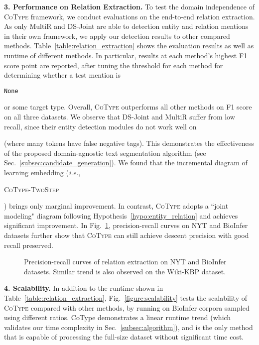 \documentclass[letterpaper]{sig-alternate-2013}
\def\ie{{\sl i.e.}}
\begin{document}
\smallskip\noindent
\textsf{\small\textbf{3. Performance on Relation Extraction.}}
To test the domain independence of \textsc{\small CoType} framework, we conduct evaluations on the end-to-end relation extraction. As only MultiR and DS-Joint are able to detection entity and relation mentions in their own framework, we apply our detection results to other compared methods.
Table~\ref{table:relation_extraction} shows the evaluation results  as well as runtime of different methods. In particular, results at each method's highest F1 score point are reported, after tuning the threshold for each method for determining whether a test mention is \begin{small}\texttt{None}\end{small} or some target type.
Overall, \textsc{\small CoType} outperforms all other methods on F1 score on all three datasets. We observe that DS-Joint and MultiR suffer from low recall, since their entity detection modules do not work well on \begin{small}\end{small} (where many tokens have false negative tags). This demonstrates the effectiveness of the proposed domain-agnostic text segmentation algorithm (see Sec.~\ref{subsec:candidate_generation}).
We found that the incremental diagram of learning embedding (\ie, \begin{small}\textsc{CoType-TwoStep}\end{small}) brings only marginal improvement. In contrast, \textsc{\small CoType} adopts a ``joint modeling" diagram following Hypothesis~\ref{hypo:entity_relation} and achieves significant improvement. In Fig.~\ref{figure:precision_recall_curve}, precision-recall curves on NYT and BioInfer datasets further show that \textsc{\small CoType} can still achieve descent precision with good recall preserved. 

\begin{figure}
\centering
\vspace{-0.4cm}
\vspace{-0.3cm}
\caption{Precision-recall curves of relation extraction on NYT and BioInfer datasets. Similar trend is also observed on the Wiki-KBP dataset.}
\label{figure:precision_recall_curve}
\vspace{-0.1cm}
\end{figure}


\smallskip
\noindent
\textsf{\small\textbf{4. Scalability.}}
In addition to the runtime shown in Table~\ref{table:relation_extraction}, Fig.~\ref{figure:scalability} tests the scalability of \textsc{CoType} compared with other methods, by running on BioInfer corpora sampled using different ratios.
CoType demonstrates a linear runtime trend (which validates our time complexity in Sec.~\ref{subsec:algorithm}), and is the only method that is capable of processing the full-size dataset without significant time cost. 
\end{document}
